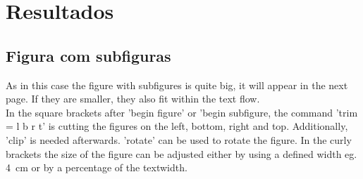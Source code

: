 \clearpage

\chapter{\textbf{Resultados}}\label{results}
\section{Figura com subfiguras}\label{res:subfigure}
As in this case the figure with subfigures is quite big, it will appear in the next page. If they are smaller, they also fit within the text flow.\\
In the square brackets after 'begin figure' or 'begin subfigure, the command 'trim = l b r t' is cutting the figures on the left, bottom, right and top. Additionally, 'clip' is needed afterwards. 'rotate' can be used to rotate the figure. In the curly brackets the size of the figure can be adjusted either by using a defined width eg. 4~cm or by a percentage of the textwidth.

